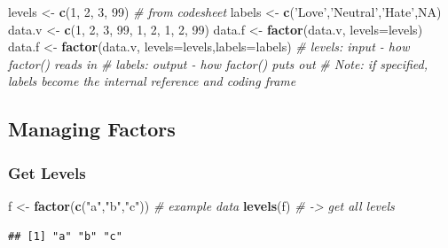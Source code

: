 \documentclass[
]{article}
\newenvironment{Shaded}{\begin{snugshade}}{\end{snugshade}}
\newcommand{\CommentTok}[1]{\textcolor[rgb]{0.56,0.35,0.01}{\textit{#1}}}
\newcommand{\DataTypeTok}[1]{\textcolor[rgb]{0.13,0.29,0.53}{#1}}
\newcommand{\DecValTok}[1]{\textcolor[rgb]{0.00,0.00,0.81}{#1}}
\newcommand{\KeywordTok}[1]{\textcolor[rgb]{0.13,0.29,0.53}{\textbf{#1}}}
\newcommand{\NormalTok}[1]{#1}
\newcommand{\OtherTok}[1]{\textcolor[rgb]{0.56,0.35,0.01}{#1}}
\newcommand{\StringTok}[1]{\textcolor[rgb]{0.31,0.60,0.02}{#1}}
\begin{document}
\begin{Shaded}
\begin{Highlighting}[]
\NormalTok{levels <-}\StringTok{ }\KeywordTok{c}\NormalTok{(}\DecValTok{1}\NormalTok{, }\DecValTok{2}\NormalTok{, }\DecValTok{3}\NormalTok{, }\DecValTok{99}\NormalTok{) }\CommentTok{# from codesheet}
\NormalTok{labels <-}\StringTok{ }\KeywordTok{c}\NormalTok{(}\StringTok{'Love'}\NormalTok{,}\StringTok{'Neutral'}\NormalTok{,}\StringTok{'Hate'}\NormalTok{,}\OtherTok{NA}\NormalTok{)}
\NormalTok{data.v <-}\StringTok{ }\KeywordTok{c}\NormalTok{(}\DecValTok{1}\NormalTok{, }\DecValTok{2}\NormalTok{, }\DecValTok{3}\NormalTok{, }\DecValTok{99}\NormalTok{, }\DecValTok{1}\NormalTok{, }\DecValTok{2}\NormalTok{, }\DecValTok{1}\NormalTok{, }\DecValTok{2}\NormalTok{, }\DecValTok{99}\NormalTok{)}
\NormalTok{data.f <-}\StringTok{ }\KeywordTok{factor}\NormalTok{(data.v, }\DataTypeTok{levels=}\NormalTok{levels)}
\NormalTok{data.f <-}\StringTok{ }\KeywordTok{factor}\NormalTok{(data.v, }\DataTypeTok{levels=}\NormalTok{levels,}\DataTypeTok{labels=}\NormalTok{labels)}
\CommentTok{# levels: input - how factor() reads in}
\CommentTok{# labels: output - how factor() puts out}
\CommentTok{# Note: if specified, labels become the internal reference and coding frame}
\end{Highlighting}
\end{Shaded}

\hypertarget{managing-factors}{%
\subsection{Managing Factors}\label{managing-factors}}

\hypertarget{get-levels}{%
\subsubsection{Get Levels}\label{get-levels}}

\begin{Shaded}
\begin{Highlighting}[]
\NormalTok{f <-}\StringTok{ }\KeywordTok{factor}\NormalTok{(}\KeywordTok{c}\NormalTok{(}\StringTok{"a"}\NormalTok{,}\StringTok{"b"}\NormalTok{,}\StringTok{"c"}\NormalTok{)) }\CommentTok{# example data}
\KeywordTok{levels}\NormalTok{(f) }\CommentTok{# -> get all levels}
\end{Highlighting}
\end{Shaded}

\begin{verbatim}
## [1] "a" "b" "c"
\end{verbatim}
\end{document}

